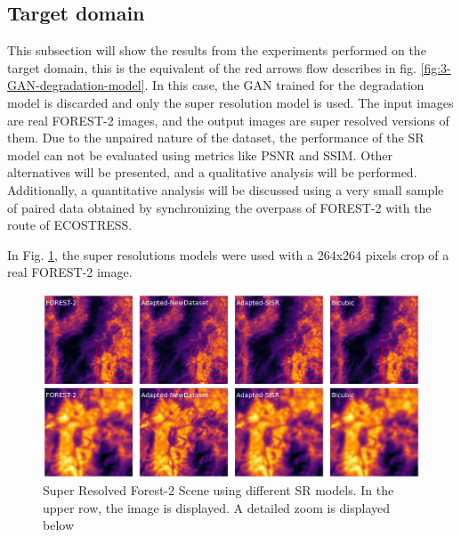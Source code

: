     \pagebreak

        
            
    
    \subsection{Target domain}

        This subsection will show the results from the experiments performed on the target domain, this is the equivalent of the red arrows flow describes in fig. \ref{fig:3-GAN-degradation-model}.
        In this case, the GAN trained for the degradation model is discarded and only the super resolution model is used.
        The input images are real FOREST-2 images, and the output images are super resolved versions of them. 
        Due to the unpaired nature of the dataset, the performance of the SR model can not be evaluated using metrics like PSNR and SSIM. 
        Other alternatives will be presented, and a qualitative analysis will be performed. 
        Additionally, a quantitative analysis will be discussed using a very small sample of paired data obtained by synchronizing the overpass of FOREST-2 with the route of ECOSTRESS.


        In Fig. \ref{fig:5-target_prediction_sample}, the super resolutions models were used with a 264x264 pixels crop of a real FOREST-2 image.

    

        \begin{figure}[H]
            \centering
            \includegraphics[scale=0.28]{Includes/5-target_prediction_sample.pdf}
            \caption{Super Resolved Forest-2 Scene using different SR models.
                     In the upper row, the image is displayed. A detailed zoom is displayed below}
            \label{fig:5-target_prediction_sample}
        \end{figure}


